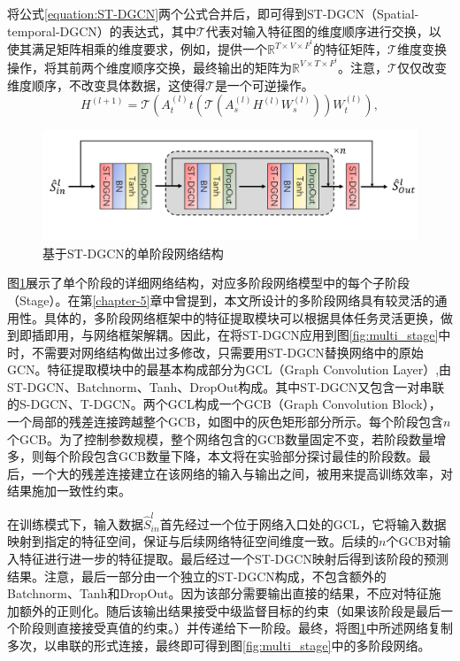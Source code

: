 将公式\ref{equation:ST-DGCN}两个公式合并后，即可得到ST-DGCN（Spatial-temporal-DGCN）的表达式，其中$\mathcal{T}$代表对输入特征图的维度顺序进行交换，以使其满足矩阵相乘的维度要求，例如，提供一个$\mathbb{R}^{T\times V\times F^{l}}$的特征矩阵，$\mathcal{T}$维度变换操作，将其前两个维度顺序交换，最终输出的矩阵为$\mathbb{R}^{V\times T\times F^{l}}$。注意，$\mathcal{T}$仅仅改变维度顺序，不改变具体数据，这使得$\mathcal{T}$是一个可逆操作。
\begin{equation}
    {H}^{(l+1)} = \mathcal{T}\left(
    {A}_{t}^{(l)}t
    \left(
    \mathcal{T}
    \left(
    {A}_{s}^{(l)}{H}^{(l)}{W}_s^{(l)}
    \right)
    \right)
    {W}_t^{(l)}
    \right),
    \label{equation:ST-DGCN_ensemble}
\end{equation}

\begin{figure}[ht]
    \centering
    \includegraphics[width=1\textwidth]{FigMa/stage_network.png}
    \vspace{-0.3cm}
    \caption{基于ST-DGCN的单阶段网络结构}
    \label{fig:stage_network_structure}
\end{figure}

图\ref{fig:stage_network_structure}展示了单个阶段的详细网络结构，对应多阶段网络模型中的每个子阶段（Stage）。在第\ref{chapter-5}章中曾提到，本文所设计的多阶段网络具有较灵活的通用性。具体的，多阶段网络框架中的特征提取模块可以根据具体任务灵活更换，做到即插即用，与网络框架解耦。因此，在将ST-DGCN应用到图\ref{fig:multi_stage}中时，不需要对网络结构做出过多修改，只需要用ST-DGCN替换网络中的原始GCN。特征提取模块中的最基本构成部分为GCL（Graph Convolution Layer）,由ST-DGCN、Batchnorm、Tanh、DropOut构成。其中ST-DGCN又包含一对串联的S-DGCN、T-DGCN。两个GCL构成一个GCB（Graph Convolution Block），一个局部的残差连接跨越整个GCB，如图中的灰色矩形部分所示。每个阶段包含$n$个GCB。为了控制参数规模，整个网络包含的GCB数量固定不变，若阶段数量增多，则每个阶段包含GCB数量下降，本文将在实验部分探讨最佳的阶段数。最后，一个大的残差连接建立在该网络的输入与输出之间，被用来提高训练效率，对结果施加一致性约束。

在训练模式下，输入数据$\hat{S}^l_{in}$首先经过一个位于网络入口处的GCL，它将输入数据映射到指定的特征空间，保证与后续网络特征空间维度一致。后续的$n$个GCB对输入特征进行进一步的特征提取。最后经过一个ST-DGCN映射后得到该阶段的预测结果。注意，最后一部分由一个独立的ST-DGCN构成，不包含额外的Batchnorm、Tanh和DropOut。因为该部分需要输出直接的结果，不应对特征施加额外的正则化。随后该输出结果接受中级监督目标的约束（如果该阶段是最后一个阶段则直接接受真值的约束。）并传递给下一阶段。最终，将图\ref{fig:stage_network_structure}中所述网络复制多次，以串联的形式连接，最终即可得到图\ref{fig:multi_stage}中的多阶段网络。

